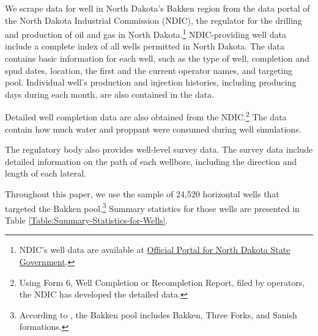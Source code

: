 
We scrape data for well in North Dakota's Bakken region from the data portal of the North Dakota Industrial Commission (NDIC), the regulator for the drilling and production of oil and gas in North Dakota.\footnote{NDIC's well data are available at \href{https://www.dmr.nd.gov/oilgas}{Official Portal for North Dakota State Government}.} NDIC-providing well data include a complete index of all wells permitted in North Dakota. The data contains basic information for each well, such as the type of well, completion and spud dates, location, the first and the current operator names, and targeting pool. Individual well's production and injection histories, including producing days during each month, are also contained in the data. 

Detailed well completion data are also obtained from the NDIC.\footnote{Using Form 6, Well Completion or Recompletion Report, filed by operators, the NDIC has developed the detailed data.} The data contain how much water and proppant were consumed during well simulations.

The regulatory body also provides well-level survey data. The survey data include detailed information on the path of each wellbore, including the direction and length of each lateral. 

Throughout this paper, we use the sample of 24,520 horizontal wells that targeted the Bakken pool.\footnote{According to \cite{Environmental-Misreporting-in-the-Bakken_Lee_2015}, the Bakken pool includes Bakken, Three Forks, and Sanish formations.} Summary statistics for those wells are presented in Table \ref{Table:Summary-Statistics-for-Wells}.
